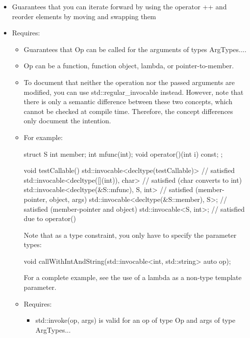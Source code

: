 \begin{itemize}
\item
Guarantees that you can iterate forward by using the operator ++ and reorder elements by moving and swapping them

\item
Requires:
\begin{itemize}
\item
Guarantees that Op can be called for the arguments of types ArgTypes....

\item
Op can be a function, function object, lambda, or pointer-to-member.

\item
To document that neither the operation nor the passed arguments are modified, you can use std::regular\_invocable instead. However, note that there is only a semantic difference between these two concepts, which cannot be checked at compile time. Therefore, the concept differences only document the intention.

\item
For example:

\begin{cpp}
struct S {
	int member;
	int mfunc(int);
	void operator()(int i) const;
};

void testCallable()
{
	std::invocable<decltype(testCallable)> // satisfied
	std::invocable<decltype([](int){}), char> // satisfied (char converts to int)
	std::invocable<decltype(&S::mfunc), S, int> // satisfied (member-pointer, object, args)
	std::invocable<decltype(&S::member), S>; // satisfied (member-pointer and object)
	std::invocable<S, int>; // satisfied due to operator()
}
\end{cpp}

Note that as a type constraint, you only have to specify the parameter types:

\begin{cpp}
void callWithIntAndString(std::invocable<int, std::string> auto op);
\end{cpp}

For a complete example, see the use of a lambda as a non-type template parameter.

\item
Requires:
\begin{itemize}
\item
std::invoke(op, args) is valid for an op of type Op and args of type ArgTypes...
\end{itemize}
\end{itemize}
\end{itemize}

